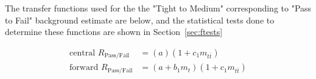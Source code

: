 The transfer functions used for the  the "Tight to Medium" corresponding to "Pass to Fail" background estimate are below, and the statistical tests done to determine these functions are shown in Section~\ref{sec:ftests}
%
%

\begin{equation}
\begin{aligned}
\text{central } R_{\text{Pass/Fail}} &= (a) (1 + c_{1} m_{t\bar{t}}) \\
\text{forward } R_{\text{Pass/Fail}} &= (a + b_{1} m_{t}) (1 + c_{1} m_{t\bar{t}}) \\
\end{aligned}
\label{eq:transfer}
\end{equation}

%

